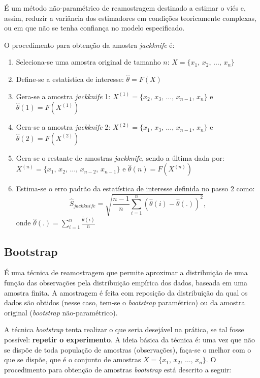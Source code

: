 \documentclass[
  portuguese,
]{estat/estat}
\providecommand{\tightlist}{%
  \setlength{\itemsep}{0pt}\setlength{\parskip}{0pt}}
\begin{document}
É um método não-paramétrico de reamostragem destinado a estimar o viés
e, assim, reduzir a variância dos estimadores em condições teoricamente
complexas, ou em que não se tenha confiança no modelo especificado.

O procedimento para obtenção da amostra \emph{jackknife} é:

\begin{enumerate}
\def\labelenumi{\arabic{enumi}.}
\tightlist
\item
  Seleciona-se uma amostra original de tamanho \(n\):
  \(X = \{x_1, \, x_2, \, \ldots, \, x_n\}\)
\item
  Define-se a estatística de interesse: \(\hat{\theta} = F(X)\)
\item
  Gera-se a amostra \emph{jackknife} 1:
  \(X^{(1)} = \{x_2, \, x_3, \, \ldots, \, x_{n-1}, \, x_n\}\) e
  \(\hat{\theta}(1) = F(X^{(1)})\)
\item
  Gera-se a amostra \emph{jackknife} 2:
  \(X^{(2)} = \{x_1, \, x_3, \, \ldots, \, x_{n-1}, \, x_n\}\) e
  \(\hat{\theta}(2) = F(X^{(2)})\)
\item
  Gera-se o restante de amostras \emph{jackknife}, sendo a última dada
  por: \(X^{(n)} = \{x_1, \, x_2, \, \ldots, \, x_{n-2}, \, x_{n-1}\}\)
  e \(\hat{\theta}(n) = F(X^{(n)})\)
\item
  Estima-se o erro padrão da estatística de interesse definida no passo
  2 como:
  \[\hat{S}_{jackknife} = \sqrt{\frac{n-1}{n}\sum_{i=1}^{n}\left(\hat{\theta}(i)-\hat{\theta}(.)\right)^2},\]
  onde \(\hat{\theta}(.)=\sum_{i=1}^{n}\frac{\hat{\theta}(i)}{n}\)
\end{enumerate}

\subsection{Bootstrap}\label{bootstrap}

É uma técnica de reamostragem que permite aproximar a distribuição de
uma função das observações pela distribuição empírica dos dados, baseada
em uma amostra finita. A amostragem é feita com reposição da
distribuição da qual os dados são obtidos (nesse caso, tem-se o
\emph{bootstrap} paramétrico) ou da amostra original (\emph{bootstrap}
não-paramétrico).

A técnica \emph{bootstrap} tenta realizar o que seria desejável na
prática, se tal fosse possível: \textbf{repetir o experimento}. A ideia
básica da técnica é: uma vez que não se dispõe de toda população de
amostras (observações), faça-se o melhor com o que se dispõe, que é o
conjunto de amostras \(X = \{x_1, \, x_2, \, \ldots, \, x_n\}\). O
procedimento para obtenção de amostras \emph{bootstrap} está descrito a
seguir:
\end{document}
